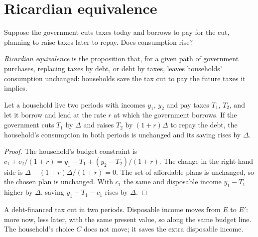 \section{Ricardian equivalence}\label{sec:b2:government-debt:ricardian}

Suppose the government cuts taxes today and borrows to pay for the cut, planning to raise taxes later to repay. Does
consumption rise?

\begin{definition}\label{def:b2:government-debt:ricardian-equivalence}
\emph{Ricardian equivalence} is the proposition that, for a given path of government
purchases, replacing taxes by debt, or debt by taxes, leaves households' consumption unchanged: households save the tax
cut to pay the future taxes it implies.
\end{definition}

\begin{proposition}\label{prop:b2:government-debt:ricardian}
Let a household live two periods with incomes $y_1$, $y_2$ and pay taxes $T_1$, $T_2$, and let it borrow and lend at the rate $r$ at which the government
borrows. If the government cuts $T_1$ by $\Delta$ and raises $T_2$ by $(1 + r)\Delta$ to repay the debt, the household's consumption in both periods is unchanged and its saving rises by $\Delta$.
\end{proposition}

\begin{proof}
The household's budget constraint is $c_1 + c_2/(1 + r) = y_1 - T_1 + (y_2 - T_2)/(1 + r)$. The change in the right-hand side is $\Delta - (1 + r)\Delta/(1 + r) = 0$. The set of affordable plans is
unchanged, so the chosen plan is unchanged. With $c_1$ the same and disposable income $y_1 - T_1$ higher by $\Delta$, saving $y_1 - T_1 - c_1$ rises by $\Delta$.
\end{proof}

\begin{omfigure}

{\small A debt-financed tax cut in two periods. Disposable income moves from $E$ to $E'$: more now, less later, with the same present value,
so along the same budget line. The household's choice $C$ does not move; it saves the extra disposable income.}
\end{omfigure}


